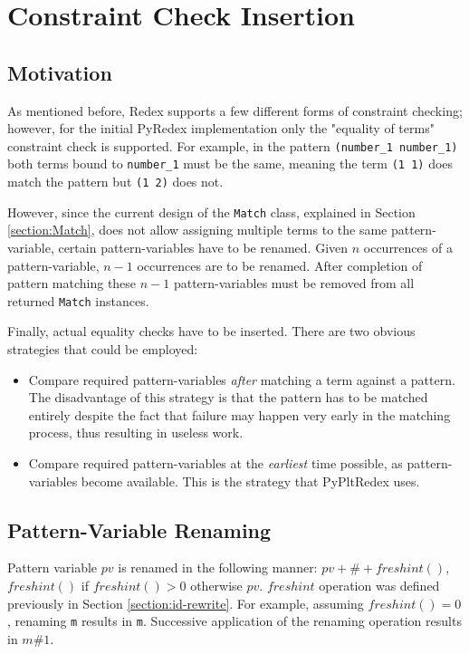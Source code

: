 \section{Constraint Check Insertion}
\label{section:constraint-check}
\subsection{Motivation}
As mentioned before, Redex supports a few different forms of constraint checking; however, for the initial PyRedex implementation only the "equality of terms" constraint check is supported. For example, in the pattern \texttt{(number\_1 number\_1)} both terms bound to \texttt{number\_1} must be the same, meaning the term \texttt{(1 1)} does match the pattern but \texttt{(1 2)} does not.

However, since the current design of the \texttt{Match} class, explained in Section \ref{section:Match}, does not allow assigning multiple terms to the same pattern-variable, certain pattern-variables have to be renamed. Given $n$ occurrences of a pattern-variable, $n-1$ occurrences are to be renamed. After completion of pattern matching these $n-1$ pattern-variables must be removed from all returned \texttt{Match} instances.

Finally, actual equality checks have to be inserted. There are two obvious strategies that could be employed:

\begin{itemize}
\item Compare required pattern-variables \textit{after} matching a term against a pattern. The disadvantage of this strategy is that the pattern has to be matched entirely despite the fact that failure may happen very early in the matching process, thus resulting in useless work.

\item Compare required pattern-variables at the \textit{earliest} time possible, as pattern-variables become available. This is the strategy that PyPltRedex uses.
\end{itemize}

\subsection{Pattern-Variable Renaming}
Pattern variable $pv$ is renamed in the following manner: $\mathit{pv + \# + freshint()}$, $\mathit{freshint()}$ if $\mathit{freshint() > 0}$ otherwise $pv$. $\mathit{freshint}$ operation was defined previously in Section \ref{section:id-rewrite}. For example, assuming $\mathit{freshint()=0}$, renaming \texttt{m} results in \texttt{m}. Successive application of the renaming operation results in \texttt{$m\#1$}.

